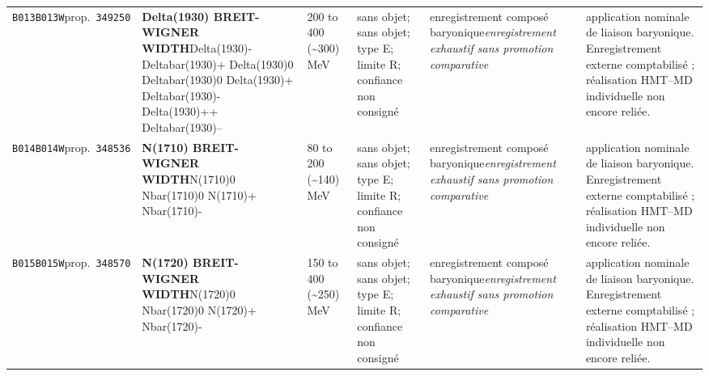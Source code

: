 \begin{landscape}
\begin{longtable}{L{1.85cm}L{4.45cm}L{2.35cm}L{4.05cm}L{3.35cm}L{7.15cm}}
\texttt{B013}\newline \texttt{B013W}\newline prop.\ \texttt{349250} & \textbf{Delta(1930) BREIT-WIGNER WIDTH}\newline Delta(1930)- \textbar{}\allowbreak{} Deltabar(1930)+ \textbar{}\allowbreak{} Delta(1930)0 \textbar{}\allowbreak{} Deltabar(1930)0 \textbar{}\allowbreak{} Delta(1930)+ \textbar{}\allowbreak{} Deltabar(1930)- \textbar{}\allowbreak{} Delta(1930)++ \textbar{}\allowbreak{} Deltabar(1930)-- & 200 to 400 (\textasciitilde{}300)\,MeV & sans objet; sans objet; type E; limite R; confiance non consigné & enregistrement composé baryonique\newline \emph{enregistrement exhaustif sans promotion comparative} & application nominale de liaison baryonique. Enregistrement externe comptabilisé ; réalisation HMT--MD individuelle non encore reliée. \\
\texttt{B014}\newline \texttt{B014W}\newline prop.\ \texttt{348536} & \textbf{N(1710) BREIT-WIGNER WIDTH}\newline N(1710)0 \textbar{}\allowbreak{} Nbar(1710)0 \textbar{}\allowbreak{} N(1710)+ \textbar{}\allowbreak{} Nbar(1710)- & 80 to 200 (\textasciitilde{}140)\,MeV & sans objet; sans objet; type E; limite R; confiance non consigné & enregistrement composé baryonique\newline \emph{enregistrement exhaustif sans promotion comparative} & application nominale de liaison baryonique. Enregistrement externe comptabilisé ; réalisation HMT--MD individuelle non encore reliée. \\
\texttt{B015}\newline \texttt{B015W}\newline prop.\ \texttt{348570} & \textbf{N(1720) BREIT-WIGNER WIDTH}\newline N(1720)0 \textbar{}\allowbreak{} Nbar(1720)0 \textbar{}\allowbreak{} N(1720)+ \textbar{}\allowbreak{} Nbar(1720)- & 150 to 400 (\textasciitilde{}250)\,MeV & sans objet; sans objet; type E; limite R; confiance non consigné & enregistrement composé baryonique\newline \emph{enregistrement exhaustif sans promotion comparative} & application nominale de liaison baryonique. Enregistrement externe comptabilisé ; réalisation HMT--MD individuelle non encore reliée. \\

\end{longtable}
\end{landscape}
